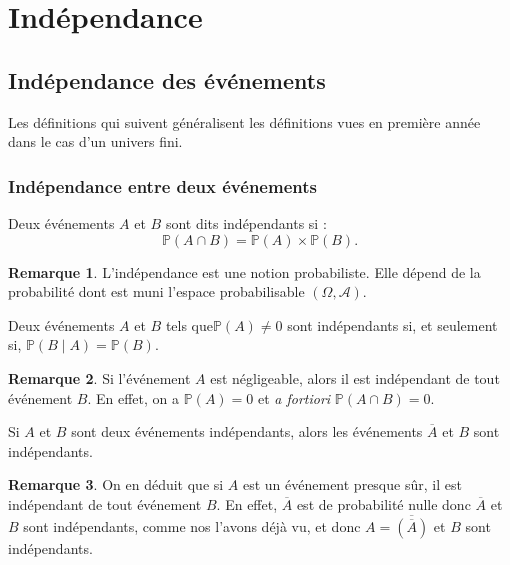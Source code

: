 \documentclass[french]{article}
\renewcommand{\P}{\mathbb{P}}
\theoremstyle{plain}
\theoremstyle{definition}
\newtheorem*{rmq}{Remarque}
\theoremstyle{remark}
\begin{document}
\section{Indépendance}

\subsection{Indépendance des événements}

Les définitions qui suivent généralisent les définitions vues en première année dans le cas d'un univers fini.

\subsubsection*{Indépendance entre deux événements}

\begin{dfn}
	Deux événements $A$ et $B$ sont dits indépendants si : $$\P(A\cap B)=\P(A)\times\P(B).$$
\end{dfn}

\begin{rmq}
	L'indépendance est une notion probabiliste. Elle dépend de la probabilité dont est muni l'espace probabilisable $(\Omega,\mathcal{A})$.
\end{rmq}

\begin{thm}{}%
	Deux événements $A$ et $B$ tels que$\P(A)\ne 0$ sont indépendants si, et seulement si, $\P(B\mid A)=\P(B)$.
\end{thm}

\begin{rmq}
	Si l'événement $A$ est négligeable, alors il est indépendant de tout événement $B$. En effet, on a $\P(A)=0$ et \textit{a fortiori} $\P(A\cap B)=0$.
\end{rmq}

\begin{thm}{}%
	Si $A$ et $B$ sont deux événements indépendants, alors les événements $\overline{A}$ et $B$ sont indépendants.
\end{thm}

\begin{rmq}
	On en déduit que si $A$ est un événement presque sûr, il est indépendant de tout événement $B$. En effet, $\overline{A}$ est de probabilité nulle donc $\overline{A}$ et $B$ sont indépendants, comme nos l'avons déjà vu, et donc $A=\overline{(\overline{A})}$ et $B$ sont indépendants.
\end{rmq}
\end{document}
